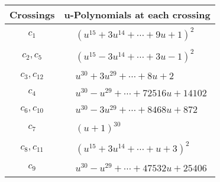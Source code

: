 \documentclass[1p]{elsarticle_modified}
\theoremstyle{definition}
\begin{document}
\begin{tabular}{m{50pt}|m{274pt}}
Crossings & \hspace{64pt}u-Polynomials at each crossing \\
\hline $$\begin{aligned}c_{1}\end{aligned}$$&$\begin{aligned}
&(u^{15}+3 u^{14}+\cdots+9 u+1)^{2}
\end{aligned}$\\
\hline $$\begin{aligned}c_{2},c_{5}\end{aligned}$$&$\begin{aligned}
&(u^{15}-3 u^{14}+\cdots+3 u-1)^{2}
\end{aligned}$\\
\hline $$\begin{aligned}c_{3},c_{12}\end{aligned}$$&$\begin{aligned}
&u^{30}+3 u^{29}+\cdots+8 u+2
\end{aligned}$\\
\hline $$\begin{aligned}c_{4}\end{aligned}$$&$\begin{aligned}
&u^{30}- u^{29}+\cdots+72516 u+14102
\end{aligned}$\\
\hline $$\begin{aligned}c_{6},c_{10}\end{aligned}$$&$\begin{aligned}
&u^{30}-3 u^{29}+\cdots+8468 u+872
\end{aligned}$\\
\hline $$\begin{aligned}c_{7}\end{aligned}$$&$\begin{aligned}
&(u+1)^{30}
\end{aligned}$\\
\hline $$\begin{aligned}c_{8},c_{11}\end{aligned}$$&$\begin{aligned}
&(u^{15}+3 u^{14}+\cdots+u+3)^{2}
\end{aligned}$\\
\hline $$\begin{aligned}c_{9}\end{aligned}$$&$\begin{aligned}
&u^{30}- u^{29}+\cdots+47532 u+25406
\end{aligned}$\\
\hline
\end{tabular}\\~\\
\end{document}
